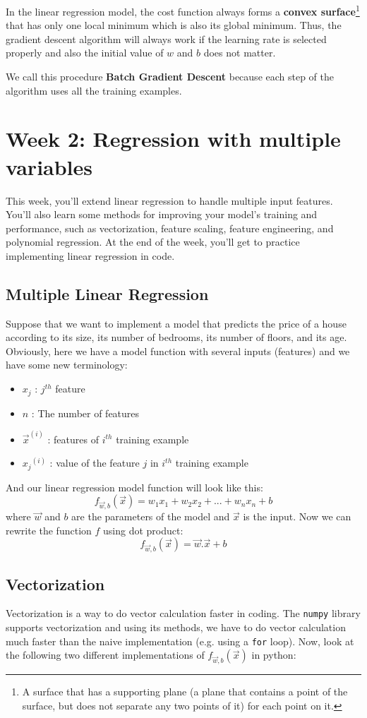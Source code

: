 \documentclass[a4paper, 12pt]{book}
\begin{document}
In the linear regression model, the cost function always forms a \textbf{convex surface}\footnote{A surface that has a supporting plane (a plane that contains a point of the surface, but does not separate any two points of it) for each point on it.} that has only one local minimum which is also its global minimum. Thus, the gradient descent algorithm will always work if the learning rate is selected properly and also the initial value of $w$ and $b$ does not matter.

We call this procedure \textbf{Batch Gradient Descent} because each step of the algorithm uses all the training examples.
\section{Week 2: Regression with multiple variables}
This week, you'll extend linear regression to handle multiple input features. You'll also learn some methods for improving your model's training and performance, such as vectorization, feature scaling, feature engineering, and polynomial regression. At the end of the week, you'll get to practice implementing linear regression in code.
\subsection{Multiple Linear Regression}
Suppose that we want to implement a model that predicts the price of a house according to its size, its number of bedrooms, its number of floors, and its age. Obviously, here we have a model function with several inputs (features) and we have some new terminology:
\begin{itemize}
    \item $x_j$ : $j^{th}$ feature
    \item $n$ : The number of features
    \item $\Vec{x}^{(i)}$ : features of $i^{th}$ training example
    \item ${x_j}^{(i)}$ : value of the feature $j$ in $i^{th}$ training example
\end{itemize}
And our linear regression model function will look like this: \[f_{\Vec{w},b} (\Vec{x}) = w_1x_1 + w_2x_2 + ... + w_nx_n + b\] where $\Vec{w}$ and $b$ are the parameters of the model and $\Vec{x}$ is the input. Now we can rewrite the function $f$ using dot product: \[f_{\Vec{w},b} (\Vec{x}) = \Vec{w}.\Vec{x} + b\]
\subsection{Vectorization}
Vectorization is a way to do vector calculation faster in coding. The \lstinline{numpy} library supports vectorization and using its methods, we have to do vector calculation much faster than the naive implementation (e.g. using a \lstinline{for} loop). Now, look at the following two different implementations of $f_{\Vec{w},b} (\Vec{x})$ in python:
\end{document}
